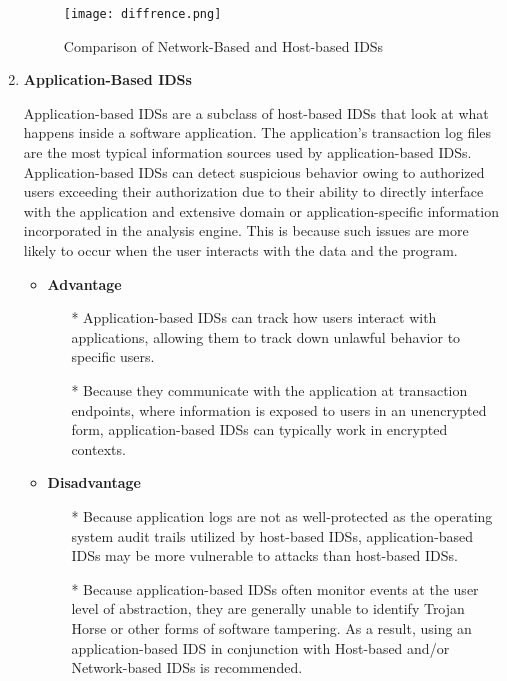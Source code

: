 \documentclass[12pt]{article}
\begin{document}
\begin{enumerate}
    \begin{figure}[h]
        \centering
        \texttt{[image: diffrence.png]}
        \caption{Comparison of Network-Based and Host-based IDSs}
    \end{figure}
    
    \item \textbf{Application-Based IDSs}
    \par Application-based IDSs are a subclass of host-based IDSs that look at what happens inside a software application. The application's transaction log files are the most typical information sources used by application-based IDSs. Application-based IDSs can detect suspicious behavior owing to authorized users exceeding their authorization due to their ability to directly interface with the application and extensive domain or application-specific information incorporated in the analysis engine. This is because such issues are more likely to occur when the user interacts with the data and the program.
    \begin{itemize}
            \item \textbf{Advantage}
            \begin{itemize}
                \item[*] Application-based IDSs can track how users interact with applications, allowing them to track down unlawful behavior to specific users.
                \item[*] Because they communicate with the application at transaction endpoints, where information is exposed to users in an unencrypted form, application-based IDSs can typically work in encrypted contexts. 
            \end{itemize}
            \clearpage
        \item \textbf{Disadvantage}
        \begin{itemize}
            \item[*] Because application logs are not as well-protected as the operating system audit trails utilized by host-based IDSs, application-based IDSs may be more vulnerable to attacks than host-based IDSs.
            \item[*] Because application-based IDSs often monitor events at the user level of abstraction, they are generally unable to identify Trojan Horse or other forms of software tampering. As a result, using an application-based IDS in conjunction with Host-based and/or Network-based IDSs is recommended.
        \end{itemize}
        \end{itemize}
    \end{enumerate}
    
\end{document}
